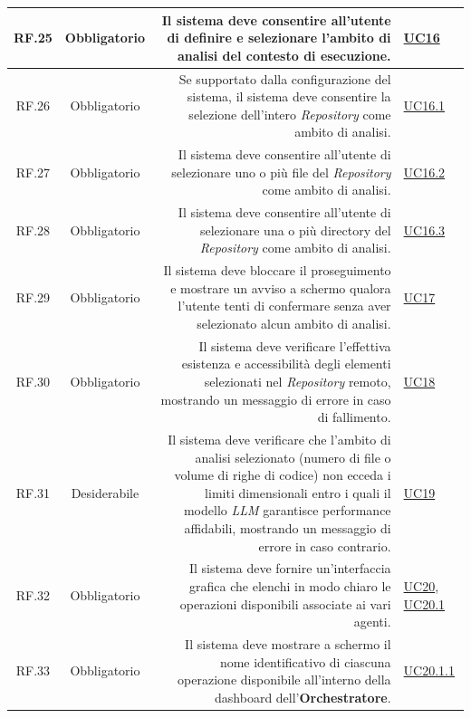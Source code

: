 \documentclass[12pt, a4paper]{article}
\begin{document}
\begin{xltabular}{\textwidth}{|c|c|D|F|}
    RF.25 & Obbligatorio & Il sistema deve consentire all'utente di definire e selezionare l'ambito di analisi del contesto di esecuzione. & \hyperref[uc:16]{UC16} \\ \hline
    
    RF.26 & Obbligatorio & Se supportato dalla configurazione del sistema, il sistema deve consentire la selezione dell'intero \textit{Repository} come ambito di analisi. & \hyperref[uc:16.1]{UC16.1} \\ \hline
    
    RF.27 & Obbligatorio & Il sistema deve consentire all'utente di selezionare uno o più file del \textit{Repository} come ambito di analisi. & \hyperref[uc:16.2]{UC16.2} \\ \hline
    
    RF.28 & Obbligatorio & Il sistema deve consentire all'utente di selezionare una o più directory del \textit{Repository} come ambito di analisi. & \hyperref[uc:16.3]{UC16.3} \\ \hline
    
    RF.29 & Obbligatorio & Il sistema deve bloccare il proseguimento e mostrare un avviso a schermo qualora l'utente tenti di confermare senza aver selezionato alcun ambito di analisi. & \hyperref[uc:17]{UC17} \\ \hline
    
    RF.30 & Obbligatorio & Il sistema deve verificare l'effettiva esistenza e accessibilità degli elementi selezionati nel \textit{Repository} remoto, mostrando un messaggio di errore in caso di fallimento. & \hyperref[uc:18]{UC18} \\ \hline
    
    RF.31 & Desiderabile & Il sistema deve verificare che l'ambito di analisi selezionato (numero di file o volume di righe di codice) non ecceda i limiti dimensionali entro i quali il modello \textit{LLM} garantisce performance affidabili, mostrando un messaggio di errore in caso contrario. & \hyperref[uc:19]{UC19} \\ \hline
    
    RF.32 & Obbligatorio & Il sistema deve fornire un'interfaccia grafica che elenchi in modo chiaro le operazioni disponibili associate ai vari agenti. & \hyperref[uc:20]{UC20}, \hyperref[uc:20.1]{UC20.1}\\ \hline
           
    RF.33 & Obbligatorio & Il sistema deve mostrare a schermo il nome identificativo di ciascuna operazione disponibile all'interno della dashboard dell'\textbf{Orchestratore}. & \hyperref[uc:20.1.1]{UC20.1.1} \\ \hline
    

\end{xltabular}
\end{document}
